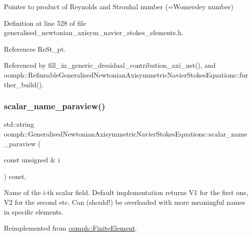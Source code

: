 Pointer to product of Reynolds and Strouhal number (=Womersley number) 



Definition at line 528 of file generalised\+\_\+newtonian\+\_\+axisym\+\_\+navier\+\_\+stokes\+\_\+elements.\+h.



References Re\+St\+\_\+pt.



Referenced by fill\+\_\+in\+\_\+generic\+\_\+dresidual\+\_\+contribution\+\_\+axi\+\_\+nst(), and oomph\+::\+Refineable\+Generalised\+Newtonian\+Axisymmetric\+Navier\+Stokes\+Equations\+::further\+\_\+build().

\mbox{\label{classoomph_1_1GeneralisedNewtonianAxisymmetricNavierStokesEquations_a4f7c28c91fd5067017676dc8b6628c3d}} 
\subsubsection{\texorpdfstring{scalar\+\_\+name\+\_\+paraview()}{scalar\_name\_paraview()}}
{\footnotesize\ttfamily std\+::string oomph\+::\+Generalised\+Newtonian\+Axisymmetric\+Navier\+Stokes\+Equations\+::scalar\+\_\+name\+\_\+paraview (\begin{DoxyParamCaption}\item[{const unsigned \&}]{i }\end{DoxyParamCaption}) const\hspace{0.3cm}{\ttfamily [inline]}, {\ttfamily [virtual]}}



Name of the i-\/th scalar field. Default implementation returns V1 for the first one, V2 for the second etc. Can (should!) be overloaded with more meaningful names in specific elements. 



Reimplemented from \hyperlink{classoomph_1_1FiniteElement_a49cc2d4f7ed5772bbc96f06760372b51}{oomph\+::\+Finite\+Element}.



